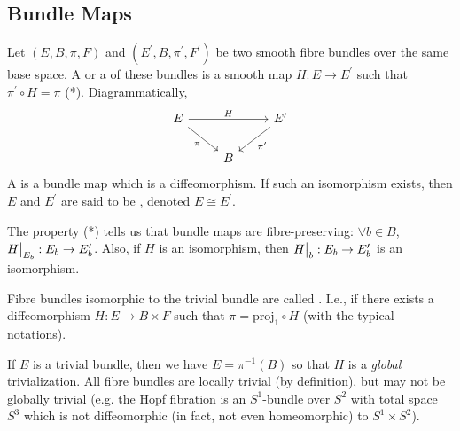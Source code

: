 \documentclass[main.tex]{subfiles}
\begin{document}
 \subsection{Bundle Maps}
 
 \begin{defn}
 Let $(E, B, \pi, F)$ and $(E^\prime, B, \pi^\prime, F^\prime)$ be two smooth fibre bundles over the same base space. A  or a  of these bundles is a smooth map $H: E \to E^\prime$ such that $\pi^\prime \circ H = \pi$ (*). Diagrammatically,
 \[
 \begin{tikzcd}
E \arrow[rd, "\pi"'] \arrow[rr, "H"] &   & E^\prime \arrow[ld, "\pi^\prime"] \\
                                     & B &                                  
\end{tikzcd}
 \]
 A   is a bundle map which is a diffeomorphism. If such an isomorphism exists, then $E$ and $E^\prime$ are said to be , denoted $E \cong E^\prime$.
 \end{defn}
 
 \begin{note}
 The property (*) tells us that bundle maps are fibre-preserving: $\forall b \in B$, $H\big|_{E_b} : E_b \to E^\prime_b$. Also, if $H$ is an isomorphism, then $H\big|_{b}: E_b \to E^\prime_b$ is an isomorphism.
 \end{note}
 
 \begin{defn}
 Fibre bundles isomorphic to the trivial bundle are called . I.e., if there exists a diffeomorphism $H: E \to B \times F$ such that $\pi = \text{proj}_1 \circ H$ (with the typical notations).
 \end{defn}
 
 \begin{note}
 If $E$ is a trivial bundle, then we have $E = \pi^{-1}(B)$ so that $H$ is a {\it global} trivialization. All fibre bundles are locally trivial (by definition), but may not be globally trivial (e.g. the Hopf fibration is an $S^1$-bundle over $S^2$ with total space $S^3$ which is not diffeomorphic (in fact, not even homeomorphic) to $S^1 \times S^2$).
 \end{note}
 
\end{document}

